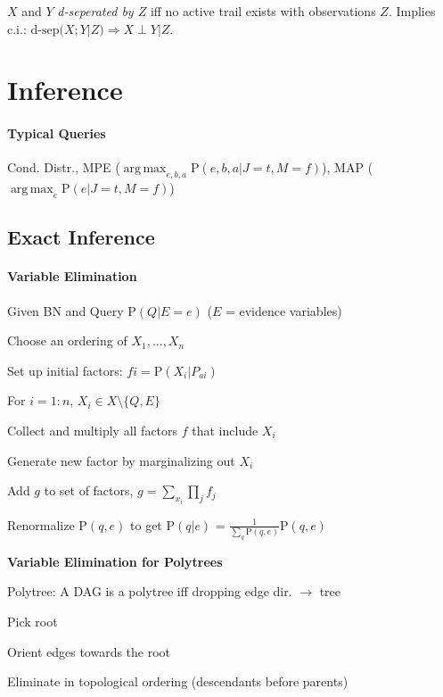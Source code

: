 \documentclass[a4paper, 10pt]{scrartcl}
\DeclareMathOperator*{\argmax}{arg\,max}
\newcommand{\uP}{\mathrm P}
\begin{document}
\begin{multicols*}{3}
		$X$ and $Y$ \emph{d-seperated by $Z$} iff no active trail exists with observations $Z$.
		Implies c.i.: $\text{d-sep}(X;Y | Z) \Rightarrow X \perp Y | Z$.
		
		\section{Inference}
		\paragraph{Typical Queries} Cond. Distr., MPE ($\argmax_{e,b,a} \uP(e,b,a | J=t, M = f)$), MAP ($\argmax_{e} \uP(e | J=t, M = f)$)
		
		\subsection{Exact Inference}
		
		\paragraph{Variable Elimination}
		\begin{compactitem}
		\item Given BN and Query $\uP(Q | E=e)$ ($E$ = evidence variables)
		\item Choose an ordering of $X_1, ..., X_n$
		\item Set up initial factors: $fi = \uP(X_i | P_{ai})$
		\item For $i =1:n$, $X_i  \in X\setminus \{Q,E\}$
		\begin{compactenum}
			\item Collect and multiply all factors $f$ that include $X_i$  
			\item Generate new factor by marginalizing out $X_i$
			\item Add $g$ to set of factors, $g = \sum_{x_i}\prod_{j}f_j$
		\end{compactenum}
		\item  Renormalize $\uP(q,e)$ to get $\uP(q | e)$ = $\frac{1}{\sum_{q}\uP(q,e)}\uP(q,e)$
		
	\end{compactitem}

		
	\textbf{Variable Elimination for Polytrees}
	
	Polytree: A DAG is a polytree iff dropping edge dir. $\to$ tree
	\begin{compactitem}
		\item Pick root
		\item Orient edges towards the root
		\item Eliminate in topological ordering (descendants before parents)
	\end{compactitem}


\end{multicols*}
\end{document}
